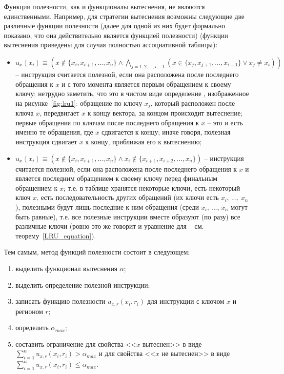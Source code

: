 Функции полезности, как и функционалы вытеснения, не являются единственными.
Например, для стратегии вытеснения \LRU возможны следующие две различные функции
полезности (далее для одной из них будет формально показано, что она
действительно является функцией полезности) (функции вытеснения приведены для
случая полностью ассоциативной таблицы):
\begin{itemize}
  \item $u_x(x_i) \equiv (x \notin \{x_i, x_{i+1}, ..., x_n\} \wedge
\bigwedge\limits_{j=1,2,...,i-1} (x \in \{x_j, x_{j+1}, ..., x_{i-1}\} \vee x_j
\neq x_i))$ -- инструкция считается полезной, если она расположена после
последнего обращения к $x$ и с того момента является первым обращением к своему
ключу; нетрудно заметить, что это в чистом виде определение \LRU, изображенное на рисунке~\ref{fig:lru1}: обращение по ключу $x_j$, который расположен после ключа $x$, передвигает $x$ к концу вектора, за концом происходит вытеснение; первые обращения по ключам после последнего обращения к $x$ -- это и есть именно те обращения, где $x$ сдвигается
к концу; иначе говоря, полезная инструкция сдвигает $x$ к концу, приближая его к
вытеснению;
  \item $u_x(x_i) \equiv (x \notin \{x_i, x_{i+1}, ..., x_n\} \wedge x_i \notin
\{x_{i+1}, x_{i+2}, ..., x_n\})$ -- инструкция считается полезной, если она
расположена после последнего обращения к $x$ и является последним обращением к
своему ключу перед финальным обращением к $x$; т.е. в таблице хранятся некоторые
ключи, есть некоторый ключ $x$, есть последовательность других обращений (их
ключи есть $x_i$, ..., $x_n$), полезными будут лишь последние к ним обращения
(среди $x_i$, ..., $x_n$ могут быть равные), т.е. все полезные инструкции вместе
образуют (по разу) все различные ключи (ровно это же говорит и уравнение для
\LRU -- см. теорему~\ref{LRU_equation}).
\end{itemize}

Тем самым, метод функций полезности состоит в следующем:
\begin{enumerate}
  \item выделить функционал вытеснения $\alpha$;
  \item выделить определение полезной инструкции;
  \item записать функцию полезности $u_{x,r}(x_i, r_i)$ для инструкции с ключом
$x$ и регионом $r$;
  \item определить $\alpha_{max}$;
  \item составить ограничение для свойства <<$x$ вытеснен>> в виде
$\sum\limits_{i=1}^n u_{x,r}(x_i, r_i) > \alpha_{max}$ и для свойства <<$x$ не
вытеснен>> в виде $\sum\limits_{i=1}^n u_{x,r}(x_i,r_i) \leqslant \alpha_{max}$.
\end{enumerate}

